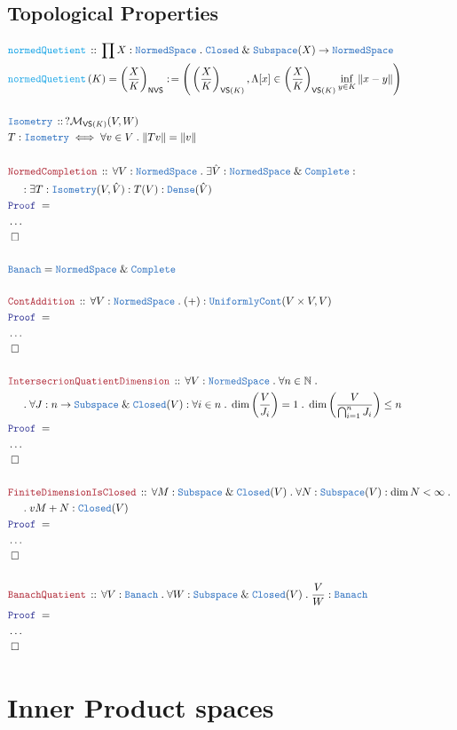 \documentclass[12pt]{scrartcl}
\newcommand{\TYPE}[1]{\textcolor{NavyBlue}{\mathtt{#1}}}
\newcommand{\FUNC}[1]{\textcolor{Cerulean}{\mathtt{#1}}}
\newcommand{\LOGIC}[1]{\textcolor{Blue}{\mathtt{#1}}}
\newcommand{\THM}[1]{\textcolor{Maroon}{\mathtt{#1}}}
\renewcommand{\.}{\; . \;}
\newcommand{\de}{: \kern 0.1pc =}
\newcommand{\Act}[1]{\left( #1 \right)}
\newcommand{\Theorem}[2]{& \THM{#1} \, :: \, #2 \\ & \Proof = \\ }
\newcommand{\DeclareType}[2]{& \TYPE{#1} \, :: \, #2 \\}
\newcommand{\DefineType}[3]{& #1 : \TYPE{#2} \iff #3 \\}
\newcommand{\DeclareFunc}[2]{& \FUNC{#1} \, :: \, #2 \\}
\newcommand{\DefineNamedFunc}[4]{&  \FUNC{#1}\Act{#2} = #3 \de #4 \\}
\newcommand{\NewLine}{\\ & \kern 1pc}
\newcommand{\Page}[1]{\begin{align*} #1 \end{align*} \newpage   }
\newcommand{\NoProof}{ & \ldots \\ \EndProof}
\renewcommand{\And}{\; \& \;}
\newcommand{\Nat}{\mathbb{N} }
\newcommand{\QED}{\; \square}
\newcommand{\EndProof}{& \QED \\}
\newcommand{\Proof}{\LOGIC{Proof} \; }
\newcommand{\Mor}{\mathcal{M}}
\newcommand{\Dense}{\TYPE{Dense}}
\newcommand{\Complete}{\TYPE{Complete}}
\newcommand{\NS}{\TYPE{NormedSpace}}
\newcommand{\Banach}{\TYPE{Banach}}
\begin{document}
\subsection{Topological Properties}
\Page{
\DeclareFunc{normedQuetient}{\prod X : \NS \. \TYPE{Closed} \And \TYPE{Subspace}(X) \to \NS   }
\DefineNamedFunc{ normedQuetient  }{ K  }{ \left(\frac{X}{K} \right)_{\mathsf{NVS}}  }
{ \Bigg( \left( \frac{X}{K} \right)_{\mathsf{VS}(K)}, \Lambda [x] \in \left( \frac{X}{K} \right)_{\mathsf{VS}(K)}    \inf_{y \in K } \|  x - y  \| \Bigg)}
\\
\DeclareType{Isometry}{ ?\Mor_{\mathsf{VS}(K)}(V,W) }
\DefineType{T}{Isometry}{ \forall v \in V \. \| Tv \| = \| v \| }
\\ 
\Theorem{NormedCompletion}{ \forall V : \NS \. \exists \hat V : \NS \And \TYPE{Complete} : 
\NewLine :
\exists T : \TYPE{Isometry}(V, \hat V ) : T(V) : \Dense(\hat V)  }
& \ldots \\
\EndProof
\\
& \Banach = \NS \And \Complete 
\\ \\
\Theorem{ContAddition}{ \forall V : \NS \. (+) : \TYPE{UniformlyCont}(V \times V, V)}
& \ldots \\
\EndProof
\\
\Theorem{IntersecrionQuatientDimension}{ 
 \forall V : \NS \. \forall n \in \Nat \. \NewLine
 \. \forall J : n \to \TYPE{Subspace} \And \TYPE{Closed}(V) : \forall i \in n \.  
 \dim \left(  \frac{V}{J_i}  \right) = 1 \.   
 \dim \left(  \frac{V}{\bigcap ^n_{i = 1}J_i}  \right)  \le n 
}
\NoProof
\\
\Theorem{FiniteDimensionIsClosed}{ \forall M :\TYPE{Subspace} \And \TYPE{Closed}(V)
\. \forall N : \TYPE{Subspace}(V) : \dim N < \infty \. 
\NewLine \.v
M + N : \TYPE{Closed}(V) }
\NoProof
\\ 
\Theorem{BanachQuatient}{\forall V : \TYPE{Banach} \. 
\forall W : \TYPE{Subspace} \And \TYPE{Closed}(V) \.
\frac{V}{W} : \TYPE{Banach}
 }
\NoProof
}
\section{Inner Product spaces}
\end{document}
